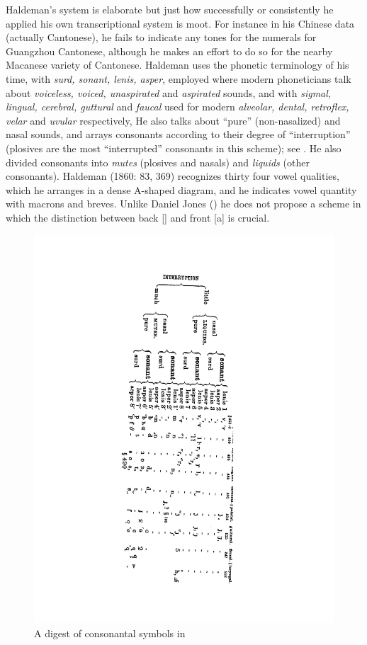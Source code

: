 \documentclass[output=paper]{LSP/langsci}
\begin{document}
Haldeman's system is elaborate but just how successfully or consistently he applied his own transcriptional system is moot. For instance in his Chinese data (actually Cantonese), he fails to indicate any tones for the numerals for Guangzhou Cantonese, although he makes an effort to do so for  the nearby Macanese variety of Cantonese.  Haldeman uses the phonetic terminology of his time, with \textit{surd, sonant, lenis, asper}, employed where modern phoneticians talk about \textit{voiceless, voiced, unaspirated} and \textit{aspirated} sounds, and with \textit{sigmal, lingual, cerebral, guttural} and \textit{faucal} used for modern \textit{alveolar, dental, retroflex, velar} and \textit{uvular} respectively,    He also talks about ``pure'' (non-nasalized) and  nasal  sounds, and arrays consonants according to their degree of ``interruption'' (plosives are the most ``interrupted'' consonants in this scheme); see .   He also divided consonants into \textit{mutes} (plosives and nasals) and \textit{liquids} (other consonants).  Haldeman (1860: 83, 369) recognizes thirty four vowel qualities, which he arranges in a dense A-shaped diagram, and he indicates vowel quantity with macrons and breves.   Unlike Daniel Jones (\citealt{Jones1909}) he does not propose a scheme in which the distinction between back [] and front [a] is crucial.  

\begin{figure} 
\caption{A digest of consonantal symbols in \citealt[121: \S576]{Haldeman1860}} \label{haldemandigest}
\includegraphics[width=.6\textwidth,angle=92]{figures/GrantConsonants}
\end{figure}
\end{document}
